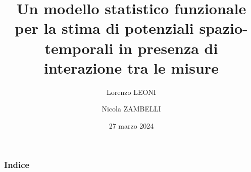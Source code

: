 \documentclass[aspectratio=169]{beamer}
\title{Un modello statistico funzionale per la stima di potenziali spazio-temporali in presenza di interazione tra le misure}
\author[L. Leoni, N. Zambelli]{Lorenzo LEONI \and Nicola ZAMBELLI}
\institute[Università degli Studi di Bergamo]{Dipartimento di Ingegneria Gestionale, delll'Informazione e della Produzione}
\date{27 marzo 2024}
\begin{document}
	
	\begin{frame}
		\titlepage
	\end{frame}
	
	\begin{frame}
		\frametitle{Indice}
		\tableofcontents
	\end{frame}
	
	
	
	
	
	
	
\end{document}
